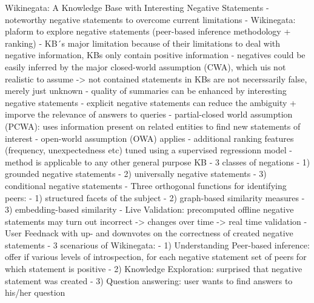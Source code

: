 \cite{arnaoutwikinegata}
Wikinegata: A Knowledge Base with Interesting Negative Statements
- noteworthy negative statements to overcome current limitations
- Wikinegata: plaform to explore negative statements (peer-based inference methodology + ranking)
- KB´s major limitation because of their limitations to  deal with negative information, KBs only contain positive information
- negatives could be easily inferred by the major closed-world assumption (CWA), which uis not realistic to assume
-> not contained statements in KBs are not necerssarily false, merely just unknown
- quality of summaries can be enhanced by interesting negative statements
- explicit negative statements can reduce the ambiguity + imporve the relevance of answers to queries
- partial-closed world assumption (PCWA): uses information present on related entities to find new statements of interest
- open-world assumption (OWA) applies
- additional ranking features (frequency, unexpectedness etc) tuned using a supervised regressionn model
- method is applicable to any other general purpose KB
- 3 classes of negations
- 1) grounded negative statements
- 2) universally negative statements
- 3) conditional negative statements
- Three orthogonal functions for identifying peers:
- 1) structured facets of the subject
- 2) graph-based similarity measures
- 3) embedding-based similarity
- Live Validation: precomputed offline negative statements may turn out incorrect -> changes over time
-> real time validation
- User Feednack with up- and downvotes on the correctness of created negative statements
- 3 scenarious of Wikinegata:
- 1) Understanding Peer-based inference: offer if various levels of introspection, for each negative statement set of peers for which statement is positive
- 2) Knowledge Exploration: surprised that negative statement was created
- 3) Question answering: user wants to find answers to his/her question




